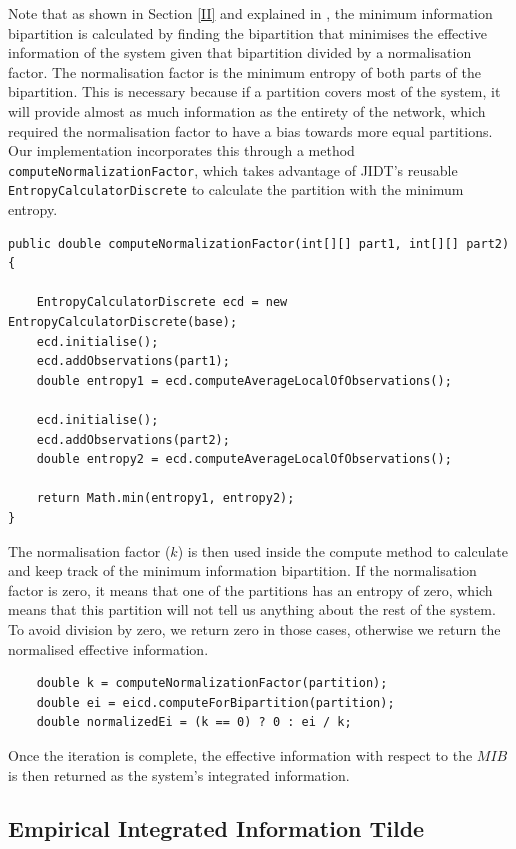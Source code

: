 \documentclass[a4paper,11pt]{article}
\begin{document}
Note that as shown in Section \ref{II} and explained in \cite{Barrett2011}, the minimum information bipartition is calculated by finding the bipartition that minimises the effective information of the system given that bipartition divided by a normalisation factor. The normalisation factor is the minimum entropy of both parts of the bipartition. This is necessary because if a partition covers most of the system, it will provide almost as much information as the entirety of the network, which required the normalisation factor to have a bias towards more equal partitions. Our implementation incorporates this through a method \texttt{computeNormalizationFactor}, which takes advantage of JIDT's reusable \texttt{EntropyCalculatorDiscrete} to calculate the partition with the minimum entropy.

\begin{verbatim}
public double computeNormalizationFactor(int[][] part1, int[][] part2) {

	EntropyCalculatorDiscrete ecd = new EntropyCalculatorDiscrete(base);
	ecd.initialise();
	ecd.addObservations(part1);
	double entropy1 = ecd.computeAverageLocalOfObservations();

	ecd.initialise();
	ecd.addObservations(part2);
	double entropy2 = ecd.computeAverageLocalOfObservations();

	return Math.min(entropy1, entropy2);
}
\end{verbatim}

The normalisation factor ($k$) is then used inside the compute method to calculate and keep track of the minimum information bipartition. If the normalisation factor is zero, it means that one of the partitions has an entropy of zero, which means that this partition will not tell us anything about the rest of the system. To avoid division by zero, we return zero in those cases, otherwise we return the normalised effective information.

\begin{verbatim}
	double k = computeNormalizationFactor(partition);
	double ei = eicd.computeForBipartition(partition);
	double normalizedEi = (k == 0) ? 0 : ei / k;
\end{verbatim}

Once the iteration is complete, the effective information with respect to the $MIB$ is then returned as the system's integrated information. 

\subsection{Empirical Integrated Information Tilde}
\label{sec:impl:phi-e-tilde}
\end{document}
